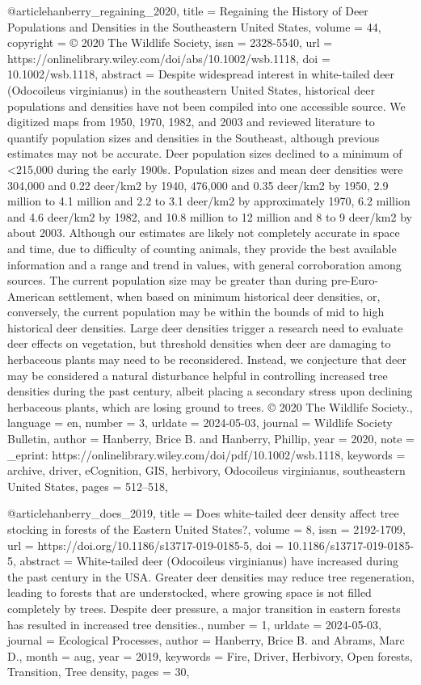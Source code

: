 {{{{@article{hanberry_regaining_2020,
	title = {Regaining the {History} of {Deer} {Populations} and {Densities} in the {Southeastern} {United} {States}},
	volume = {44},
	copyright = {© 2020 The Wildlife Society},
	issn = {2328-5540},
	url = {https://onlinelibrary.wiley.com/doi/abs/10.1002/wsb.1118},
	doi = {10.1002/wsb.1118},
	abstract = {Despite widespread interest in white-tailed deer (Odocoileus virginianus) in the southeastern United States, historical deer populations and densities have not been compiled into one accessible source. We digitized maps from 1950, 1970, 1982, and 2003 and reviewed literature to quantify population sizes and densities in the Southeast, although previous estimates may not be accurate. Deer population sizes declined to a minimum of {\textless}215,000 during the early 1900s. Population sizes and mean deer densities were 304,000 and 0.22 deer/km2 by 1940, 476,000 and 0.35 deer/km2 by 1950, 2.9 million to 4.1 million and 2.2 to 3.1 deer/km2 by approximately 1970, 6.2 million and 4.6 deer/km2 by 1982, and 10.8 million to 12 million and 8 to 9 deer/km2 by about 2003. Although our estimates are likely not completely accurate in space and time, due to difficulty of counting animals, they provide the best available information and a range and trend in values, with general corroboration among sources. The current population size may be greater than during pre-Euro-American settlement, when based on minimum historical deer densities, or, conversely, the current population may be within the bounds of mid to high historical deer densities. Large deer densities trigger a research need to evaluate deer effects on vegetation, but threshold densities when deer are damaging to herbaceous plants may need to be reconsidered. Instead, we conjecture that deer may be considered a natural disturbance helpful in controlling increased tree densities during the past century, albeit placing a secondary stress upon declining herbaceous plants, which are losing ground to trees. © 2020 The Wildlife Society.},
	language = {en},
	number = {3},
	urldate = {2024-05-03},
	journal = {Wildlife Society Bulletin},
	author = {Hanberry, Brice B. and Hanberry, Phillip},
	year = {2020},
	note = {\_eprint: https://onlinelibrary.wiley.com/doi/pdf/10.1002/wsb.1118},
	keywords = {archive, driver, eCognition, GIS, herbivory, Odocoileus virginianus, southeastern United States},
	pages = {512--518},
}

@article{hanberry_does_2019,
	title = {Does white-tailed deer density affect tree stocking in forests of the {Eastern} {United} {States}?},
	volume = {8},
	issn = {2192-1709},
	url = {https://doi.org/10.1186/s13717-019-0185-5},
	doi = {10.1186/s13717-019-0185-5},
	abstract = {White-tailed deer (Odocoileus virginianus) have increased during the past century in the USA. Greater deer densities may reduce tree regeneration, leading to forests that are understocked, where growing space is not filled completely by trees. Despite deer pressure, a major transition in eastern forests has resulted in increased tree densities.},
	number = {1},
	urldate = {2024-05-03},
	journal = {Ecological Processes},
	author = {Hanberry, Brice B. and Abrams, Marc D.},
	month = aug,
	year = {2019},
	keywords = {Fire, Driver, Herbivory, Open forests, Transition, Tree density},
	pages = {30},
}

}}}}

